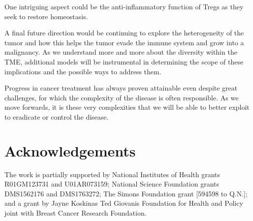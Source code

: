 \documentclass[11pt]{article}
\begin{document}
One intriguing aspect could be the anti-inflammatory function of Tregs as they seek to restore homeostasis.
\par
A final future direction would be continuing to explore the heterogeneity of the tumor and how this helps the tumor evade the immune system and grow into a malignancy. 
As we understand more and more about the diversity within the TME, additional models will be instrumental in determining the scope of these implications and the possible ways to address them.
\par
Progress in cancer treatment has always proven attainable even despite great challenges, for which the complexity of the disease is often responsible. As we move forwards, it is these very complexities that we will be able to better exploit to eradicate or control the disease.


\section*{Acknowledgements}
The work is partially supported by National Institutes of Health grants R01GM123731 and U01AR073159; National Science Foundation grants DMS1562176 and DMS1763272; The Simons Foundation grant [594598 to Q.N.]; and a grant by Jayne Koskinas Ted Giovanis Foundation for Health and Policy joint with Breast Cancer Research Foundation.



\end{document}
